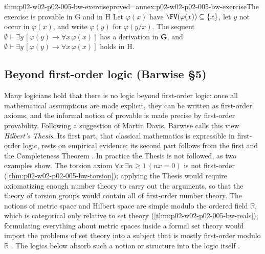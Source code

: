 \begin{hbtheorem}{thm:p02-w02-p02-005-bw-exercise}{proved=annex:p02-w02-p02-005-bw-exercise}{The exercise is provable in G and in H}
Let \(\varphi(x)\) have \(\FV(\varphi(x))\subseteq\{x\}\), let \(y\) not occur
in \(\varphi(x)\), and write \(\varphi(y)\) for \(\varphi(y/x)\).  The
sequent \(\emptyset\vdash\exists y\,[\varphi(y)\to\forall x\,\varphi(x)]\)
has a derivation in \(\mathbf G\), and
\(\emptyset\vdash\exists y\,[\varphi(y)\to\forall x\,\varphi(x)]\) holds in H.
\end{hbtheorem}

\subsection{Beyond first-order logic (Barwise \S5)}
\label{sec:p02-w02-p02-005-bw-beyond}

Many logicians hold that there is no logic beyond first-order logic: once
all mathematical assumptions are made explicit, they can be written as
first-order axioms, and the informal notion of provable is made precise by
first-order provability.  Following a suggestion of Martin Davis, Barwise
calls this view \emph{Hilbert's Thesis}.  Its first part, that classical
mathematics is expressible in first-order logic, rests on empirical
evidence; its second part follows from the first and the Completeness
Theorem \cite[ch.~A.1, \S5, p.~41]{Barwise1977FirstOrder}.  In practice
the Thesis is not followed, as two examples show.  The torsion axiom
\(\forall x\,\exists n\geq1\,(nx=0)\) is not first-order
(\cref{thm:p02-w02-p02-005-bw-torsion}); applying the Thesis would
require axiomatizing enough number theory to carry out the arguments, so
that the theory of torsion groups would contain all of first-order number
theory.  The notions of metric space and Hilbert space are simple modulo
the ordered field \(\mathbb R\), which is categorical only relative to set
theory (\cref{thm:p02-w02-p02-005-bw-reals}); formulating everything about
metric spaces inside a formal set theory would import the problems of set
theory into a subject that is mostly first-order modulo \(\mathbb R\)
\cite[ch.~A.1, \S5, p.~41]{Barwise1977FirstOrder}.  The logics below absorb
such a notion or structure into the logic itself
\cite[ch.~A.1, \S5, p.~42]{Barwise1977FirstOrder}.

